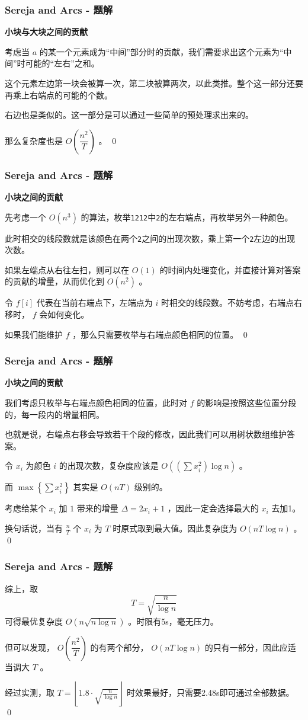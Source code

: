 \documentclass[9pt,dvipsnames,table]{beamer}
\newenvironment{qedframe}{%
	\begin{frame}[environment=qedqedframe]%
	}{%
	\qed
	\end{frame}%
}
\begin{document}
\begin{qedframe}
	\frametitle{Sereja and Arcs - 题解}
	\textbf{小块与大块之间的贡献} \pause
	
	考虑当 $ a $ 的某一个元素成为``中间''部分时的贡献，我们需要求出这个元素为``中间''时可能的``左右''之和。
	
	这个元素左边第一块会被算一次，第二块被算两次，以此类推。整个这一部分还要再乘上右端点的可能的个数。
	
	右边也是类似的。这一部分是可以通过一些简单的预处理求出来的。
	
	那么复杂度也是 $ O\left(\dfrac{n^2}{T}\right) $ 。
\end{qedframe}
\begin{qedframe}
	\frametitle{Sereja and Arcs - 题解}
	\textbf{小块之间的贡献} \pause

	先考虑一个 $ O(n^3) $ 的算法，枚举\texttt{1212}中\texttt{2}的左右端点，再枚举另外一种颜色。
	
	此时相交的线段数就是该颜色在两个\texttt{2}之间的出现次数，乘上第一个\texttt{2}左边的出现次数。 \pause
	
	如果左端点从右往左扫，则可以在 $ O(1) $ 的时间内处理变化，并直接计算对答案的贡献的增量，从而优化到 $ O(n^2) $ 。 \pause
	
	令 $ f[i] $ 代表在当前右端点下，左端点为 $ i $ 时相交的线段数。不妨考虑，右端点右移时， $ f $ 会如何变化。
	
	如果我们能维护 $ f $ ，那么只需要枚举与右端点颜色相同的位置。
\end{qedframe}
\begin{qedframe}
	\frametitle{Sereja and Arcs - 题解}
	\textbf{小块之间的贡献} \pause
	
	我们考虑只枚举与右端点颜色相同的位置，此时对 $ f $ 的影响是按照这些位置分段的，每一段内的增量相同。
	
	也就是说，右端点右移会导致若干个段的修改，因此我们可以用树状数组维护答案。 \pause
	
	令 $ x_i $ 为颜色 $ i $ 的出现次数，复杂度应该是 $ O\left(\left(\sum x^2_i\right)\log n\right) $ 。
	
	而 $ \max\left\{\sum x^2_i\right\} $ 其实是 $ O(nT) $ 级别的。
	
	考虑给某个 $ x_i $ 加 $ 1 $ 带来的增量 $ \Delta=2x_i+1 $ ，因此一定会选择最大的 $ x_i $ 去加1。
	
	换句话说，当有 $ \frac{n}{T} $ 个 $ x_i $ 为 $ T $ 时原式取到最大值。因此复杂度为 $ O(nT\log n) $ 。
\end{qedframe}
\begin{qedframe}
	\frametitle{Sereja and Arcs - 题解}
	综上，取
	\[T=\sqrt{\frac{n}{\log n}}\]
	可得最优复杂度 $ O\left(n\sqrt{n\log n}\right) $ 。时限有5s，毫无压力。 \pause
	
	但可以发现， $ O\left(\dfrac{n^2}{T}\right) $ 的有两个部分， $ O(nT\log n) $ 的只有一部分，因此应适当调大 $ T $ 。
	
	经过实测，取 $ T=\left\lfloor1.8\cdot\sqrt{\frac{n}{\log n}}\right\rfloor $ 时效果最好，只需要2.48s即可通过全部数据。
\end{qedframe}
\end{document}
